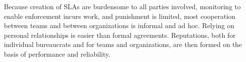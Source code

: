 Because creation of SLAs are burdensome to all parties involved, monitoring to enable enforcement incurs work, and punishment is limited, most cooperation between teams and between organizations is informal and ad hoc. Relying on personal relationships is easier than formal agreements. Reputations, both for individual bureaucrats and for teams and organizations, are then formed on the basis of performance and reliability.



